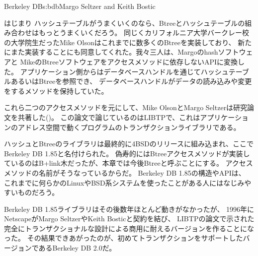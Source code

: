 \begin{aosachapter}{Berkeley DB}{s:bdb}{Margo Seltzer and Keith Bostic}
\begin{aosasect1}{はじまり}
ハッシュテーブルがうまくいくのなら、Btreeとハッシュテーブルの組み合わせはもっとうまくいくだろう。
同じくカリフォルニア大学バークレー校の大学院生だったMike Olsonはこれまでに数多くのBtreeを実装しており、
新たにまた実装することにも同意してくれた。我々三人は、Margoのhashソフトウェアと
MikeのBtreeソフトウェアをアクセスメソッドに依存しないAPIに変換した。
アプリケーション側からはデータベースハンドルを通じてハッシュテーブルあるいはBtreeを参照でき、
データベースハンドルがデータの読み込みや変更をするメソッドを保持していた。

これら二つのアクセスメソッドを元にして、Mike OlsonとMargo Seltzerは研究論文を共著した(\cite{bib:seltzer:libtp})。
この論文で論じているのはLIBTPで、これはアプリケーションのアドレス空間で動くプログラムのトランザクションライブラリである。

ハッシュとBtreeのライブラリは最終的に4BSDのリリースに組み込まれ、ここでBerkeley DB 1.85と名付けられた。
偽寿的にはBtreeアクセスメソッドが実装しているのはB+link木だったが、本章では今後Btreeと呼ぶことにする。
アクセスメソッドの名前がそうなっているからだ。
Berkeley DB 1.85の構造やAPIは、
これまでに何らかのLinuxやBSD系システムを使ったことがある人にはなじみやすいものだろう。

Berkeley DB 1.85ライブラリはその後数年ほとんど動きがなかったが、
1996年にNetscapeがMargo SeltzerやKeith Bosticと契約を結び、
LIBTPの論文で示された完全にトランザクショナルな設計による商用に耐えるバージョンを作ることになった。
その結果できあがったのが、初めてトランザクションをサポートしたバージョンであるBerkeley DB 2.0だ。


\end{aosasect1}
\end{aosachapter}

